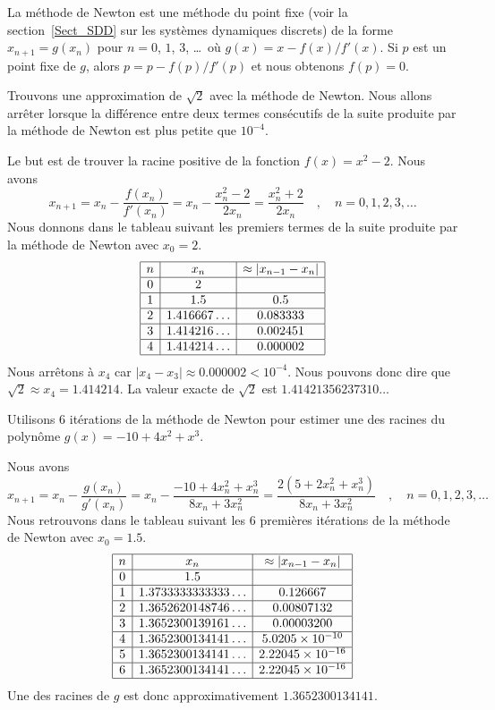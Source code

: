 {\begin{rmk}[\theory]
La méthode de Newton est une méthode du point fixe (voir
la section~\ref{Sect_SDD} sur les systèmes dynamiques discrets) de la
forme $x_{n+1}=g(x_n)$ pour $n=0$, $1$, $3$, \ldots\  où
$g(x)= x - f(x)/f'(x)$.  Si $p$ est un point fixe de $g$,
alors $p = p - f(p)/f'(p)$ et nous obtenons $f(p) = 0$.
\end{rmk}

\begin{egg}
Trouvons une approximation de $\sqrt{2}$ avec la méthode de Newton.
Nous allons arrêter lorsque la différence entre deux termes consécutifs de la
suite produite par la méthode de Newton est plus petite que
$10^{-4}$.

Le but est de trouver la racine positive de la fonction $f(x) = x^2 - 2$.
Nous avons
\[
x_{n+1} = x_n - \frac{f(x_n)}{f'(x_n)}
= x_n - \frac{x_n^2-2}{2 x_n}
= \frac{x_n^2+2}{2 x_n} \quad , \quad n=0,1,2,3,\ldots
\]
Nous donnons dans le tableau suivant les premiers termes de la suite
produite par la méthode de Newton avec $x_0=2$.
\[
\begin{array}{|c|c|c|}
\hline
n & x_n & \approx |x_{n-1}-x_n| \\ \hline
0 & 2 & \\ \hline
1 & 1.5 & 0.5 \\ \hline
2 & 1.416667\ldots & 0.083333 \\ \hline
3 & 1.414216\ldots & 0.002451 \\ \hline
4 & 1.414214\ldots & 0.000002 \\ \hline
\end{array}
\]
Nous arrêtons à $x_4$ car $|x_4-x_3| \approx 0.000002 < 10^{-4}$.
Nous pouvons donc dire que $\sqrt{2} \approx x_4 = 1.414214$.  La
valeur exacte de $\sqrt{2}$ est $1.41421356237310\ldots$
\end{egg}

\begin{egg}
Utilisons $6$ itérations de la méthode de Newton pour estimer une des
racines du polynôme $g(x) = -10 + 4 x^2 + x^3$.

Nous avons
\[
x_{n+1} = x_n - \frac{g(x_n)}{g'(x_n)}
= x_n - \frac{-10 + 4 x_n^2 + x_n^3}{8 x_n + 3 x_n^2}
= \frac{2 \left( 5 + 2 x_n^2 + x_n^3 \right)}{8 x_n + 3 x_n^2}
\quad , \quad n=0,1,2,3,\ldots
\]
Nous retrouvons dans le tableau suivant les $6$ premières itérations de la
méthode de Newton avec $x_0 = 1.5$.
\[
\begin{array}{|c|c|c|}
\hline
n & x_n & \approx |x_{n-1}-x_n| \\ \hline
0 & 1.5 & \\ \hline
1 & 1.3733333333333\ldots & 0.126667 \\ \hline
2 & 1.3652620148746\ldots & 0.00807132 \\ \hline
3 & 1.3652300139161\ldots & 0.00003200 \\ \hline
4 & 1.3652300134141\ldots & 5.0205\times 10^{-10} \\ \hline
5 & 1.3652300134141\ldots & 2.22045\times 10^{-16} \\ \hline
6 & 1.3652300134141\ldots & 2.22045\times 10^{-16} \\ \hline
\end{array}
\]
Une des racines de $g$ est donc approximativement 
$1.3652300134141$.


\end{egg}}
